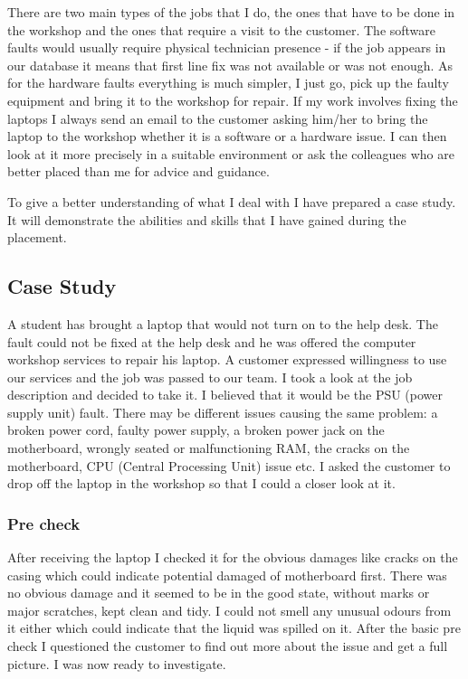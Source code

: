 \documentclass[10pt,a4paper,headinclude=true,twoside]{report}
\begin{document}
There are two main types of the jobs that I do, the ones that have to be done in the workshop and the ones that require a visit to the customer. The software faults would usually require physical technician presence - if the job appears in our database it means that first line fix was not available or was not enough. As for the hardware faults everything is much simpler, I just go, pick up the faulty equipment and bring it to the workshop for repair. If my work involves fixing the laptops I always send an email to the customer asking him/her to bring the laptop to the workshop whether it is a software or a hardware issue. I can then look at it more precisely in a suitable environment or ask the colleagues who are better placed than me for advice and guidance.

To give a better understanding of what I deal with I have prepared a case study. It will demonstrate the abilities and skills that I have gained during the placement. 

\subsection{Case Study}
A student has brought a laptop that would not turn on to the help desk. The fault could not be fixed at the help desk and he was offered the computer workshop services to repair his laptop. A customer expressed willingness to use our services and the job was passed to our team. I took a look at the job description and decided to take it. I believed that it would be the PSU (power supply unit) fault. There may be different issues causing the same problem: a broken power cord, faulty power supply, a broken power jack on the motherboard, wrongly seated or malfunctioning RAM, the cracks on the motherboard, CPU (Central Processing Unit) issue etc. I asked the customer to drop off the laptop in the workshop so that I could a closer look at it. 
\subsubsection{Pre check}
After receiving the laptop I checked it for the obvious damages like cracks on the casing which could indicate potential damaged of motherboard first. There was no obvious damage and it seemed to be in the good state, without marks or major scratches, kept clean and tidy. I could not smell any unusual odours from it either which could indicate that the liquid was spilled on it. After the basic pre check I questioned the customer to find out more about the issue and get a full picture. I was now ready to investigate.
\end{document}
